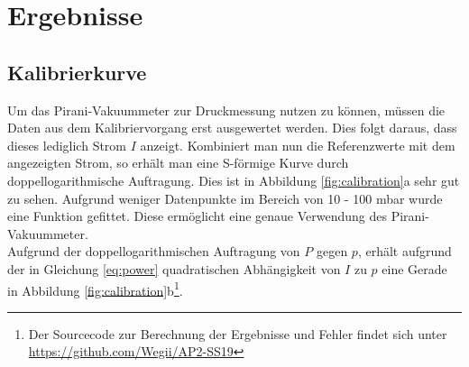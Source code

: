 \documentclass[a4paper,usenatbib]{aspdoc}
\begin{document}
    \section{Ergebnisse}\label{sec:result}
        \subsection{Kalibrierkurve}
            Um das Pirani-Vakuummeter zur Druckmessung nutzen zu können, müssen die Daten aus dem Kalibriervorgang erst ausgewertet werden. Dies folgt daraus, dass dieses lediglich Strom $I$ anzeigt. Kombiniert man nun die Referenzwerte mit dem angezeigten Strom, so erhält man eine S-förmige Kurve durch doppellogarithmische Auftragung. Dies ist in Abbildung \ref{fig:calibration}a sehr gut zu sehen. Aufgrund weniger Datenpunkte im Bereich von 10 - 100 mbar wurde eine Funktion gefittet. Diese ermöglicht eine genaue Verwendung des Pirani-Vakuummeter.\\
            Aufgrund der doppellogarithmischen Auftragung von $P$ gegen $p$, erhält aufgrund der in Gleichung \ref{eq:power} quadratischen Abhängigkeit von $I$ zu $p$ eine Gerade in Abbildung \ref{fig:calibration}b\footnote{Der Sourcecode zur Berechnung der Ergebnisse und Fehler findet sich unter \url{https://github.com/Wegii/AP2-SS19}\label{note:source}}.
            
\end{document}
